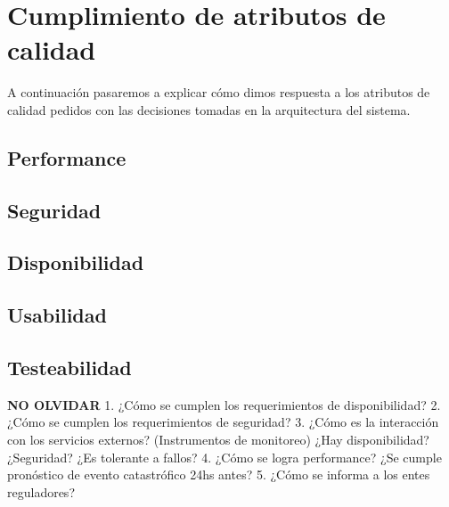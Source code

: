 \section{Cumplimiento de atributos de calidad}

\par A continuación pasaremos a explicar cómo dimos respuesta a los atributos de calidad pedidos con las decisiones tomadas en la arquitectura del sistema.

\subsection{Performance}

\par

\subsection{Seguridad}

\par

\subsection{Disponibilidad}

\par

\subsection{Usabilidad}

\par

\subsection{Testeabilidad}

\par



\textbf{NO OLVIDAR}
1. ¿Cómo se cumplen los requerimientos de disponibilidad?
2. ¿Cómo se cumplen los requerimientos de seguridad?
3. ¿Cómo es la interacción con los servicios externos? (Instrumentos de monitoreo) ¿Hay
disponibilidad? ¿Seguridad? ¿Es tolerante a fallos?
4. ¿Cómo se logra performance? ¿Se cumple pronóstico de evento catastrófico 24hs
antes?
5. ¿Cómo se informa a los entes reguladores?
